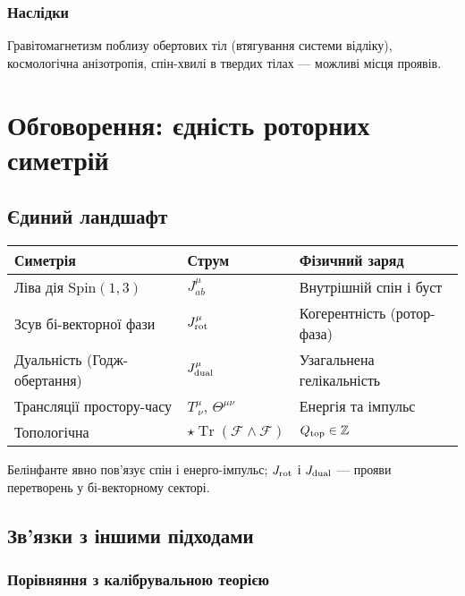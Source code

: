 \documentclass[11pt,a4paper]{article}
\numberwithin{equation}{section}
\theoremstyle{plain}
\theoremstyle{definition}
\theoremstyle{remark}
\DeclareMathOperator{\Tr}{Tr}
\begin{document}
\subsubsection{Наслідки}

Гравітомагнетизм поблизу обертових тіл (втягування системи відліку), космологічна анізотропія, спін-хвилі в твердих тілах — можливі місця проявів.

\section{Обговорення: єдність роторних симетрій}
\label{sec:discussion}

\subsection{Єдиний ландшафт}

\begin{center}
\renewcommand{\arraystretch}{1.3}
\begin{tabular}{@{}lll@{}}
\toprule
Симетрія & Струм & Фізичний заряд \\
\midrule
Ліва дія $\mathrm{Spin}(1,3)$ & $J^\mu_{ab}$ & Внутрішній спін і буст \\
Зсув бі-векторної фази & $J^\mu_{\rm rot}$ & Когерентність (ротор-фаза) \\
Дуальність (Годж-обертання) & $J^\mu_{\rm dual}$ & Узагальнена гелікальність \\
Трансляції простору-часу & $T^{\mu}_{\ \nu}$, $\Theta^{\mu\nu}$ & Енергія та імпульс \\
Топологічна & $\star\Tr(\mathcal{F}\wedge\mathcal{F})$ & $Q_{\rm top}\in\mathbb{Z}$ \\
\bottomrule
\end{tabular}
\end{center}

Белінфанте явно пов’язує спін і енерго-імпульс; $J_{\rm rot}$ і $J_{\rm dual}$ — прояви перетворень у бі-векторному секторі.

\subsection{Зв’язки з іншими підходами}

\subsubsection{Порівняння з калібрувальною теорією}
\end{document}

